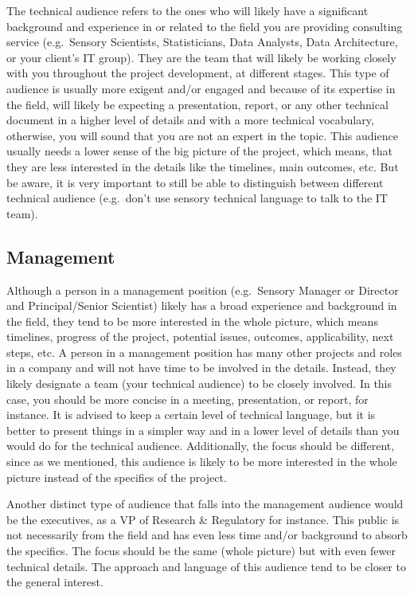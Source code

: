 \documentclass[
]{krantz}
\begin{document}
The technical audience refers to the ones who will likely have a significant background and experience in or related to the field you are providing consulting service (e.g.~Sensory Scientists, Statisticians, Data Analysts, Data Architecture, or your client's IT group). They are the team that will likely be working closely with you throughout the project development, at different stages. This type of audience is usually more exigent and/or engaged and because of its expertise in the field, will likely be expecting a presentation, report, or any other technical document in a higher level of details and with a more technical vocabulary, otherwise, you will sound that you are not an expert in the topic. This audience usually needs a lower sense of the big picture of the project, which means, that they are less interested in the details like the timelines, main outcomes, etc. But be aware, it is very important to still be able to distinguish between different technical audience (e.g.~don't use sensory technical language to talk to the IT team).

\hypertarget{management}{%
\subsection{Management}\label{management}}

Although a person in a management position (e.g.~Sensory Manager or Director and Principal/Senior Scientist) likely has a broad experience and background in the field, they tend to be more interested in the whole picture, which means timelines, progress of the project, potential issues, outcomes, applicability, next steps, etc. A person in a management position has many other projects and roles in a company and will not have time to be involved in the details. Instead, they likely designate a team (your technical audience) to be closely involved. In this case, you should be more concise in a meeting, presentation, or report, for instance. It is advised to keep a certain level of technical language, but it is better to present things in a simpler way and in a lower level of details than you would do for the technical audience. Additionally, the focus should be different, since as we mentioned, this audience is likely to be more interested in the whole picture instead of the specifics of the project.

Another distinct type of audience that falls into the management audience would be the executives, as a VP of Research \& Regulatory for instance. This public is not necessarily from the field and has even less time and/or background to absorb the specifics. The focus should be the same (whole picture) but with even fewer technical details. The approach and language of this audience tend to be closer to the general interest.
\end{document}

